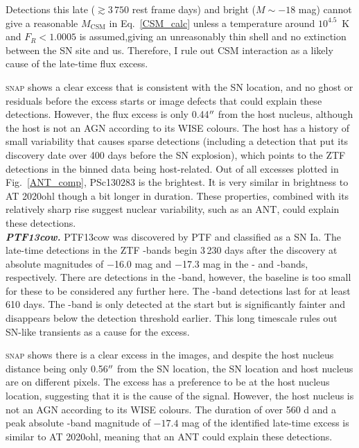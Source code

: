 \documentclass[a4paper,oneside,12pt, class=Latex/Classes/PhDthesisPSnPDF, crop=false]{standalone}
\begin{document}
Detections this late ($\gtrsim 3\,750$ rest frame days) and bright ($M \sim -18$ mag) cannot give a reasonable $M_\text{CSM}$ in Eq.~\ref{CSM_calc} unless a temperature around $10^{4.5}$~K and $F_R < 1.0005$ is assumed,giving an unreasonably thin shell and no extinction between the SN site and us. Therefore, I rule out CSM interaction as a likely cause of the late-time flux excess.

\textsc{snap} shows a clear excess that is consistent with the SN location, and no ghost or residuals before the excess starts or image defects that could explain these detections. However, the flux excess is only 0.44$^{\prime\prime}$ from the host nucleus, although the host is not an AGN according to its WISE colours. The host has a history of small variability that causes sparse detections (including a detection that put its discovery date over 400 days before the SN explosion), which points to the ZTF detections in the binned data being host-related. Out of all excesses plotted in Fig.~\ref{ANT_comp}, PSc130283 is the brightest. It is very similar in brightness to AT 2020ohl though a bit longer in duration. These properties, combined with its relatively sharp rise suggest nuclear variability, such as an ANT, could explain these detections.\\


\textit{\textbf{PTF13cow.}}
PTF13cow was discovered by PTF and classified as a SN Ia. The late-time detections in the ZTF \ztfg\ztfr\ztfi-bands begin 3\,230 days after the discovery at absolute magnitudes of $-$16.0 mag and $-$17.3 mag in the \ztfg- and \ztfr-bands, respectively. There are detections in the \ztfi-band, however, the baseline is too small for these to be considered any further here. The \ztfr-band detections last for at least 610 days. The \ztfg-band is only detected at the start but is significantly fainter and disappears below the detection threshold earlier. This long timescale rules out SN-like transients as a cause for the excess.

\textsc{snap} shows there is a clear excess in the images, and despite the host nucleus distance being only 0.56$^{\prime\prime}$ from the SN location, the SN location and host nucleus are on different pixels. The excess has a preference to be at the host nucleus location, suggesting that it is the cause of the signal. However, the host nucleus is not an AGN according to its WISE colours. The duration of over 560 d and a peak absolute \ztfr-band magnitude of $-17.4$ mag of the identified late-time excess is similar to AT 2020ohl, meaning that an ANT could explain these detections.\\
\end{document}
